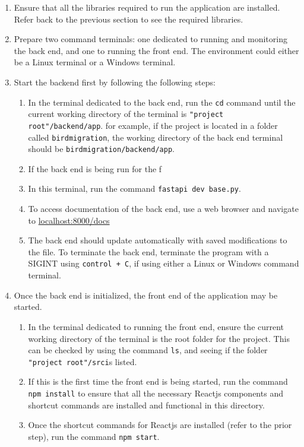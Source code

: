 \documentclass{article}
\begin{document}
\begin{enumerate}
    \item Ensure that all the libraries required to run the application are installed. Refer back to the previous section to see the required libraries.
    \item Prepare two command terminals: one dedicated to running and monitoring the back end, and one to running the front end. The environment could either be a Linux terminal or a Windows terminal.
    \item Start the backend first by following the following steps:
    \begin{enumerate}
        \item In the terminal dedicated to the back end, run the \texttt{cd} command until the current working directory of the terminal is \texttt{"project root"/backend/app}. for example, if the project is located in a folder called \texttt{birdmigration}, the working directory of the back end terminal should be \texttt{birdmigration/backend/app}.
        \item If the back end is being run for the f
        \item In this terminal, run the command \texttt{fastapi dev base.py}.
        \item To access documentation of the back end, use a web browser and navigate to \url{localhost:8000/docs}
        \item The back end should update automatically with saved modifications to the file. To terminate the back end, terminate the program with a SIGINT using \texttt{control + C}, if using either a Linux or Windows command terminal.
    \end{enumerate}
    \item Once the back end is initialized, the front end of the application may be started.
    \begin{enumerate}
        \item In the terminal dedicated to running the front end, ensure the current working directory of the terminal is the root folder for the project. This can be checked by using the command \texttt{ls}, and seeing if the folder \texttt{"project root"/src}\texttt is listed.
        \item If this is the first time the front end is being started, run the command \texttt{npm install} to ensure that all the necessary Reactjs components and shortcut commands are installed and functional in this directory.
        \item Once the shortcut commands for Reactjs are installed (refer to the prior step), run the command \texttt{npm start}.

\end{enumerate}
\end{enumerate}
\end{document}
